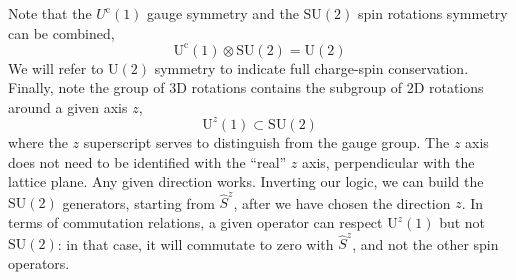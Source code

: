 Note that the $U^\mathrm{c}(1)$ gauge symmetry and the $\mathrm{SU}(2)$ spin rotations symmetry can be combined,
\[
	\mathrm{U}^\mathrm{c}(1) \otimes \mathrm{SU}(2) = \mathrm{U}(2)
\]
We will refer to $\mathrm{U}(2)$ symmetry to indicate full charge-spin conservation. Finally, note the group of $3$D rotations contains the subgroup of $2$D rotations around a given axis $z$,
\[
	\mathrm{U}^z(1) \subset \mathrm{SU}(2)
\]
where the $z$ superscript serves to distinguish from the gauge group. The $z$ axis does not need to be identified with the ``real'' $z$ axis, perpendicular with the lattice plane. Any given direction works. Inverting our logic, we can build the $\mathrm{SU}(2)$ generators, starting from $\hat S^z$, after we have chosen the direction $z$. In terms of commutation relations, a given operator can respect $\mathrm{U}^z(1)$ but not $\mathrm{SU}(2)$: in that case, it will commutate to zero with $\hat S^z$, and not the other spin operators.

